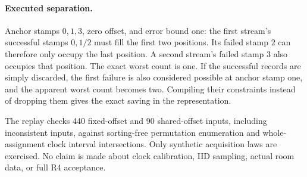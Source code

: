 \documentclass[11pt]{article}
\begin{document}
\paragraph{Executed separation.}
Anchor stamps \(0,1,3\), zero offset, and error bound one:
the first stream's successful stamps \(0,1/2\) must fill the
first two positions. Its failed stamp \(2\) can therefore
only occupy the last position. A second stream's failed stamp
\(3\) also occupies that position. The exact worst count is one.
If the successful records are simply discarded, the first
failure is also considered possible at anchor stamp one, and
the apparent worst count becomes two. Compiling their constraints
instead of dropping them gives the exact saving in the representation.

The replay checks 440 fixed-offset and 90 shared-offset inputs,
including inconsistent inputs, against sorting-free permutation
enumeration and whole-assignment clock interval intersections.
Only synthetic acquisition laws are exercised. No claim is made
about clock calibration, IID sampling, actual room data, or
full R4 acceptance.
\end{document}
